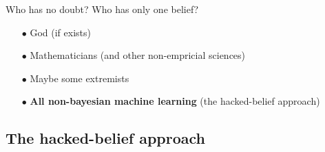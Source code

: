\documentclass[shownotes]{beamer}
\begin{document}
\begin{frame}
 \vspace{0.5cm}


\begin{center}
 \centering \large
  Who has no doubt? Who has only one belief?
\end{center}
 
 \vspace{0.3cm}
 \pause
 
 \begin{itemize}
  \item[$\bullet$] God (if exists) \pause
  \item[$\bullet$] Mathematicians (and other non-empricial sciences) \pause
  \item[$\bullet$] Maybe some extremists \pause
  \item[$\bullet$] \textbf{All non-bayesian machine learning} \pause (the hacked-belief approach)
 \end{itemize}

 
\end{frame}




\subsection{The hacked-belief approach}
\end{document}
